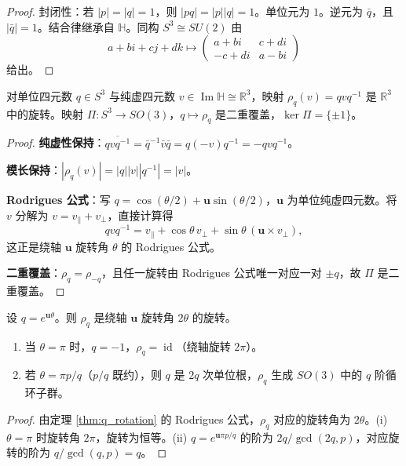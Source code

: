 \begin{proof}
封闭性：若 $|p|=|q|=1$，则 $|pq|=|p||q|=1$。单位元为 $1$。逆元为 $\bar q$，且 $|\bar q|=1$。结合律继承自 $\mathbb{H}$。同构 $S^3\cong SU(2)$ 由
\[
a+bi+cj+dk\longmapsto
\begin{pmatrix}
a+bi & c+di\\
-c+di & a-bi
\end{pmatrix}
\]
给出。
\end{proof}

\begin{theorem}[四元数共轭作用与三维旋转]\label{thm:q_rotation}
对单位四元数 $q\in S^3$ 与纯虚四元数 $v\in\operatorname{Im}\mathbb{H}\cong\mathbb{R}^3$，映射 $\rho_q(v)=q v q^{-1}$ 是 $\mathbb{R}^3$ 中的旋转。映射 $\Pi:S^3\to SO(3)$，$q\mapsto\rho_q$ 是二重覆盖，$\ker\Pi=\{\pm 1\}$。
\end{theorem}

\begin{proof}
\textbf{纯虚性保持}：$\overline{qvq^{-1}}=\bar q^{-1}\bar v\bar q=q(-v)q^{-1}=-qvq^{-1}$。

\textbf{模长保持}：$|\rho_q(v)|=|q||v||q^{-1}|=|v|$。

\textbf{Rodrigues 公式}：写 $q=\cos(\theta/2)+\mathbf{u}\sin(\theta/2)$，$\mathbf{u}$ 为单位纯虚四元数。将 $v$ 分解为 $v=v_\parallel+v_\perp$，直接计算得
\[
qvq^{-1}=v_\parallel+\cos\theta\,v_\perp+\sin\theta\,(\mathbf{u}\times v_\perp),
\]
这正是绕轴 $\mathbf{u}$ 旋转角 $\theta$ 的 Rodrigues 公式。

\textbf{二重覆盖}：$\rho_q=\rho_{-q}$，且任一旋转由 Rodrigues 公式唯一对应一对 $\pm q$，故 $\Pi$ 是二重覆盖。
\end{proof}

\begin{corollary}[三维旋转的周期结构]\label{cor:q_rotation_period}
设 $q=e^{\mathbf{u}\theta}$。则 $\rho_q$ 是绕轴 $\mathbf{u}$ 旋转角 $2\theta$ 的旋转。
\begin{enumerate}[label=(\roman*)]
    \item 当 $\theta=\pi$ 时，$q=-1$，$\rho_q=\operatorname{id}$（绕轴旋转 $2\pi$）。
    \item 若 $\theta=\pi p/q$（$p/q$ 既约），则 $q$ 是 $2q$ 次单位根，$\rho_q$ 生成 $SO(3)$ 中的 $q$ 阶循环子群。
\end{enumerate}
\end{corollary}

\begin{proof}
由定理 \ref{thm:q_rotation} 的 Rodrigues 公式，$\rho_q$ 对应的旋转角为 $2\theta$。(i) $\theta=\pi$ 时旋转角 $2\pi$，旋转为恒等。(ii) $q=e^{\mathbf{u}\pi p/q}$ 的阶为 $2q/\gcd(2q,p)$，对应旋转的阶为 $q/\gcd(q,p)=q$。
\end{proof}

